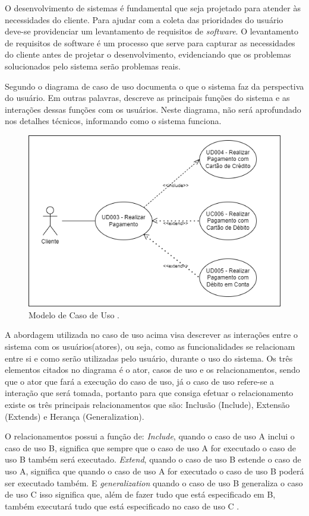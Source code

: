    O desenvolvimento de sistemas é fundamental que seja projetado para atender às necessidades do cliente. Para ajudar com a coleta das prioridades do usuário deve-se providenciar um levantamento de requisitos de \textit{software}. O levantamento de requisitos de software é um processo que serve para capturar as necessidades do cliente antes de projetar o desenvolvimento, evidenciando que os problemas solucionados pelo sistema serão problemas reais.
    
    Segundo  o diagrama de caso de uso documenta o que o sistema faz da perspectiva do usuário. Em outras palavras, descreve as principais funções do sistema e as interações dessas funções com os usuários. Neste diagrama, não será aprofundado nos detalhes técnicos, informando como o sistema funciona.
    
    \begin{figure}[h]
    \centering
    \includegraphics[width=0.78
    \textwidth]{./img/CasoUsoModelo.png}
    \caption{Modelo de Caso de Uso .}
    \label{fig:CasoUsoModelo}
    \end{figure}
    
    A abordagem utilizada no caso de uso acima visa descrever as interações entre o sistema com os usuários(atores), ou seja, como as funcionalidades se relacionam entre si e como serão utilizadas pelo usuário, durante o uso do sistema. Os três elementos citados no diagrama é o ator, casos de uso e os relacionamentos, sendo que o ator que fará a execução do caso de uso, já o caso de uso refere-se a interação que será tomada, portanto para que consiga efetuar o relacionamento existe os três principais relacionamentos que são: Inclusão (Include), Extensão (Extends) e Herança (Generalization).
    
    O relacionamentos possui a função de: \textit{Include}, quando o caso de uso A inclui o caso de uso B, significa que sempre que o caso de uso A for executado o caso de uso B também será executado. \textit{Extend}, quando o caso de uso B estende o caso de uso A, significa que quando o caso de uso A for executado o caso de uso B poderá ser executado também. E \textit{generalization} quando o caso de uso B generaliza o caso de uso C isso significa que, além de fazer tudo que está especificado em B, também executará tudo que está especificado no caso de uso C \cite{venturaP}.

